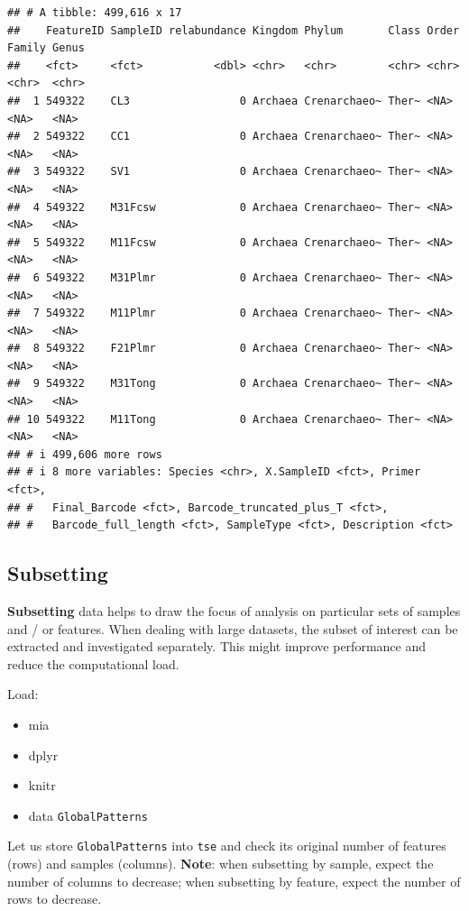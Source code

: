 \documentclass[
]{book}
\providecommand{\tightlist}{%
  \setlength{\itemsep}{0pt}\setlength{\parskip}{0pt}}
\begin{document}
\begin{verbatim}
## # A tibble: 499,616 x 17
##    FeatureID SampleID relabundance Kingdom Phylum       Class Order Family Genus
##    <fct>     <fct>           <dbl> <chr>   <chr>        <chr> <chr> <chr>  <chr>
##  1 549322    CL3                 0 Archaea Crenarchaeo~ Ther~ <NA>  <NA>   <NA> 
##  2 549322    CC1                 0 Archaea Crenarchaeo~ Ther~ <NA>  <NA>   <NA> 
##  3 549322    SV1                 0 Archaea Crenarchaeo~ Ther~ <NA>  <NA>   <NA> 
##  4 549322    M31Fcsw             0 Archaea Crenarchaeo~ Ther~ <NA>  <NA>   <NA> 
##  5 549322    M11Fcsw             0 Archaea Crenarchaeo~ Ther~ <NA>  <NA>   <NA> 
##  6 549322    M31Plmr             0 Archaea Crenarchaeo~ Ther~ <NA>  <NA>   <NA> 
##  7 549322    M11Plmr             0 Archaea Crenarchaeo~ Ther~ <NA>  <NA>   <NA> 
##  8 549322    F21Plmr             0 Archaea Crenarchaeo~ Ther~ <NA>  <NA>   <NA> 
##  9 549322    M31Tong             0 Archaea Crenarchaeo~ Ther~ <NA>  <NA>   <NA> 
## 10 549322    M11Tong             0 Archaea Crenarchaeo~ Ther~ <NA>  <NA>   <NA> 
## # i 499,606 more rows
## # i 8 more variables: Species <chr>, X.SampleID <fct>, Primer <fct>,
## #   Final_Barcode <fct>, Barcode_truncated_plus_T <fct>,
## #   Barcode_full_length <fct>, SampleType <fct>, Description <fct>
\end{verbatim}

\hypertarget{subsetting}{%
\subsection{Subsetting}\label{subsetting}}

\textbf{Subsetting} data helps to draw the focus of analysis on particular
sets of samples and / or features. When dealing with large datasets,
the subset of interest can be extracted and investigated
separately. This might improve performance and reduce the
computational load.

Load:

\begin{itemize}
\tightlist
\item
  mia
\item
  dplyr
\item
  knitr
\item
  data \texttt{GlobalPatterns}
\end{itemize}

Let us store \texttt{GlobalPatterns} into \texttt{tse} and check its original number of features (rows) and samples (columns). \textbf{Note}: when subsetting by sample, expect the number of columns to decrease; when subsetting by feature, expect the number of rows to decrease.
\end{document}
